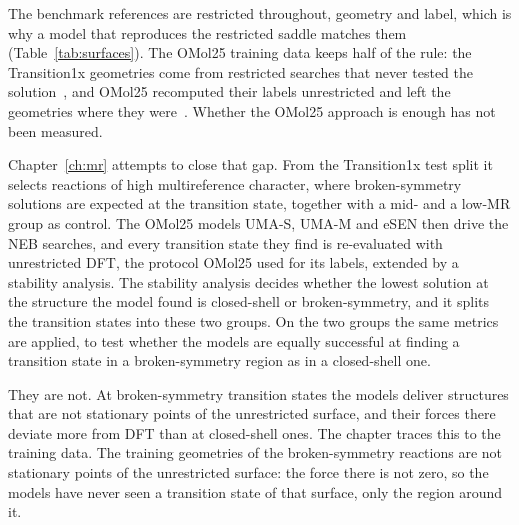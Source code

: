 The benchmark references are restricted throughout, geometry and label,
which is why a model that reproduces the restricted saddle matches them
(Table~\ref{tab:surfaces}).
The OMol25 training data keeps half of the rule: the Transition1x
geometries come from restricted searches that never tested the
solution~\cite{schreiner2022}, and OMol25 recomputed their labels
unrestricted and left the geometries where they were~\cite{omol25}.
Whether the OMol25 approach is enough has not been measured.

Chapter~\ref{ch:mr} attempts to close that gap. From the Transition1x
test split it selects reactions of high multireference character,
where broken-symmetry solutions are expected at the transition state,
together with a mid- and a low-MR group as control. The OMol25 models
UMA-S, UMA-M and eSEN then drive the NEB searches, and every transition
state they find is re-evaluated with unrestricted DFT, the protocol
OMol25 used for its labels, extended by a stability analysis. The
stability analysis decides whether the lowest solution at the structure
the model found is closed-shell or broken-symmetry, and it splits the
transition states into these two groups. On the two groups the same
metrics are applied, to test whether the models are equally successful
at finding a transition state in a broken-symmetry region as in a
closed-shell one.

They are not. At broken-symmetry transition states the models deliver
structures that are not stationary points of the unrestricted surface,
and their forces there deviate more from DFT than at closed-shell ones.
The chapter traces this to the training data. The training geometries of the broken-symmetry reactions are not
stationary points of the unrestricted surface: the force there is
not zero, so the models have never seen a transition state of that
surface, only the region around it.
